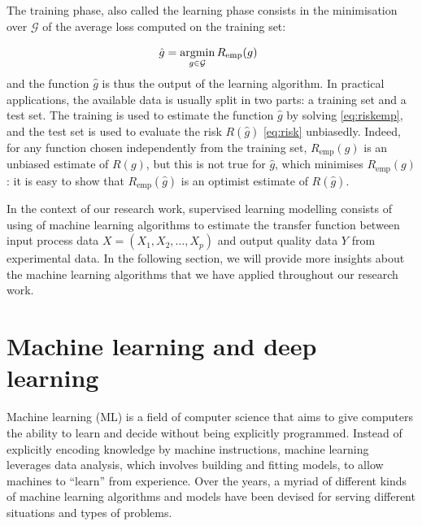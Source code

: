 The training phase, also called the learning phase consists in the minimisation over $\mathcal{G}$ of the average loss computed on the training set:

\begin{equation}\label{eq:riskemp}
    \hat{g} = \operatorname*{argmin}_{g\in\mathcal{G}}  R_\mathrm{emp}(g)
    \enspace
\end{equation}
and the function $\hat{g}$ is thus the output of the learning algorithm. 
In practical applications, the available data is usually split in two parts: a training set and a test set. The training is used to estimate the function $\hat{g}$ by solving \eqref{eq:riskemp}, and the test set is used to evaluate the risk $R(\hat{g})$ \eqref{eq:risk} unbiasedly. 
Indeed, for any function chosen independently from the training set, $R_\mathrm{emp}(g)$ is an unbiased estimate of $R(g)$, but this is not true for $\hat{g}$, which minimises $R_\mathrm{emp}(g)$: it is easy to show that $R_\mathrm{emp}(\hat{g})$ is an optimist estimate of $R(\hat{g})$. 

In the context of our research work, supervised learning modelling consists of using of machine learning algorithms to estimate the transfer function between input process data $X=(X_1,X_2,\ldots,X_p)$ and output quality data $Y$ from experimental data. In the following section, we will provide more insights about the machine learning algorithms that we have applied throughout our research work.

\section{Machine learning and deep learning} \label{Machine learning and Deep Learning}

Machine learning (ML) is a field of computer science that aims to give computers the ability to learn and decide without being explicitly programmed. Instead of explicitly encoding knowledge by machine instructions, machine learning leverages data analysis, which involves building and fitting models, to allow machines to ``learn'' from experience. Over the years, a myriad of different kinds of machine learning algorithms and models have been devised for serving different situations and types of problems. 

